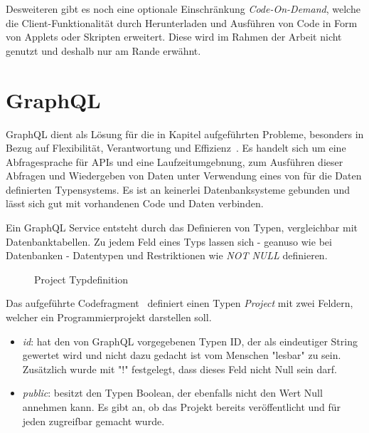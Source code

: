 Desweiteren gibt es noch eine optionale Einschränkung \emph{Code-On-Demand}, welche die Client-Funktionalität durch Herunterladen und Ausführen von Code in
Form von Applets oder Skripten erweitert. Diese wird im Rahmen der Arbeit nicht genutzt und deshalb nur am Rande erwähnt.

\section{GraphQL}
\label{sec:basics:graphql}
GraphQL dient als Lösung für die in Kapitel  aufgeführten Probleme, besonders in Bezug auf Flexibilität, Verantwortung und Effizienz~\cite{graphql-scalablepath}.
Es handelt sich um eine Abfragesprache für APIs und eine Laufzeitumgebnung,
zum Ausführen dieser Abfragen und Wiedergeben von Daten unter Verwendung eines von für die Daten definierten Typensystems.
Es ist an keinerlei Datenbanksysteme gebunden und lässt sich gut mit vorhandenen Code und Daten verbinden.

Ein GraphQL Service entsteht durch das Definieren von Typen, vergleichbar mit Datenbanktabellen. Zu jedem Feld eines Typs lassen sich - geanuso wie bei Datenbanken -
Datentypen und Restriktionen wie \emph{NOT NULL} definieren.

\begin{figure}[h]
    
    \caption{Project Typdefinition}
    \label{fig:basics:graphql:1}
\end{figure}

Das aufgeführte Codefragment~ definiert einen Typen \emph{Project} mit zwei Feldern, welcher ein Programmierprojekt darstellen soll.
\begin{itemize}
    \item \emph{id}: hat den von GraphQL vorgegebenen Typen ID, der als eindeutiger String gewertet wird und nicht dazu gedacht ist vom Menschen "lesbar" zu sein.
    Zusätzlich wurde mit "!" festgelegt, dass dieses Feld nicht Null sein darf.
    \item \emph{public}: besitzt den Typen Boolean, der ebenfalls nicht den Wert Null annehmen kann.
    Es gibt an, ob das Projekt bereits veröffentlicht und für jeden zugreifbar gemacht wurde.
\end{itemize}

